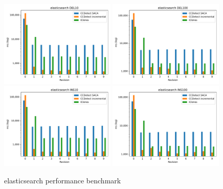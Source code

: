 \vfill

\newpage
\null
\vfill
\begin{figure}[H]
    \begin{center}
        \includegraphics[width=0.49\textwidth]{figures/performancegraphs/elasticsearch_DEL10.pdf}
        \includegraphics[width=0.49\textwidth]{figures/performancegraphs/elasticsearch_DEL100.pdf}
        \includegraphics[width=0.49\textwidth]{figures/performancegraphs/elasticsearch_INS10.pdf} \includegraphics[width=0.49\textwidth]{figures/performancegraphs/elasticsearch_INS100.pdf} \end{center}
    \caption{elasticsearch performance benchmark}
    \label{fig:elasticsearch}
\end{figure}

